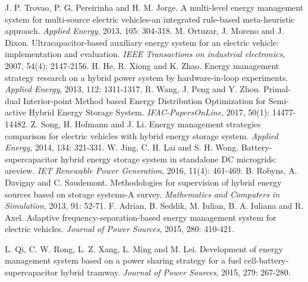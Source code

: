 \documentclass[energies,article,submit,moreauthors,pdftex,10pt,a4paper]{Definitions/mdpi}
\begin{document}
\begin{thebibliography}{999}
J. P. Trovao, P. G. Pereirinha and H. M. Jorge. A multi-level energy management system for multi-source electric vehicles-an integrated rule-based meta-heuristic approach. {\em Applied Energy}, 2013, 105: 304-318.
M. Ortuzar, J. Moreno and J. Dixon. Ultracapacitor-based auxiliary energy system for an electric vehicle: implementation and evaluation. {\em IEEE Transactions on industrial electronics}, 2007, 54(4): 2147-2156.
H. He, R. Xiong and K. Zhao. Energy management strategy research on a hybrid power system by hardware-in-loop experiments. {\em Applied Energy}, 2013, 112: 1311-1317.
R. Wang, J. Peng and Y. Zhou. Primal-dual Interior-point Method based Energy Distribution Optimization for Semi-active Hybrid Energy Storage System. {\em IFAC-PapersOnLine}, 2017, 50(1): 14477-14482.
Z. Song, H. Hofmann and J. Li. Energy management strategies comparison for electric vehicles with hybrid energy storage system. {\em Applied Energy}, 2014, 134: 321-331.
W. Jing, C. H. Lai and S. H. Wong. Battery-supercapacitor hybrid energy storage system in standalone DC microgrids: areview. {\em IET Renewable Power Generation}, 2016, 11(4): 461-469.
B. Robyns, A. Davigny and C. Saudemont. Methodologies for supervision of hybrid energy sources based on storage systems-A survey. {\em Mathematics and Computers in Simulation}, 2013, 91: 52-71.
F. Adrian, B. Seddik, M. Iulian, B. A. Iuliana and R. Axel. Adaptive frequency-separation-based energy management system for electric vehicles. {\em Journal of Power Sources}, 2015, 280: 410-421.

L. Qi, C. W. Rong, L. Z. Xang, L. Ming and M. Lei. Development of energy management system based on a power sharing strategy for a fuel cell-battery-supercapacitor hybrid tramway. {\em Journal of Power Sources}, 2015, 279: 267-280.


\end{thebibliography}
\end{document}
